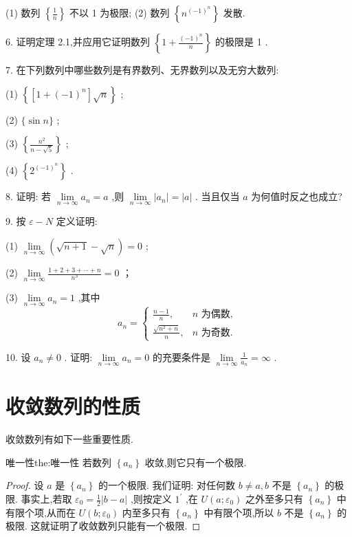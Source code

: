 (1) 数列 \(\left\{  \frac{1}{n}\right\}\) 不以 1 为极限; (2) 数列 \(\left\{  {n}^{{\left( -1\right) }^{n}}\right\}\) 发散.

6. 证明定理 2.1,并应用它证明数列 \(\left\{  {1 + \frac{{\left( -1\right) }^{n}}{n}}\right\}\) 的极限是 1 .

7. 在下列数列中哪些数列是有界数列、无界数列以及无穷大数列:

(1) \(\left\{  {\left\lbrack  {1 + {\left( -1\right) }^{n}}\right\rbrack  \sqrt{n}}\right\}\) ;

(2) \(\{ \sin n\}\) ;

(3) \(\left\{  \frac{{n}^{2}}{n - \sqrt{5}}\right\}\) ;

(4) \(\left\{  {2}^{{\left( -1\right) }^{n}}\right\}\) .

8. 证明: 若 \(\mathop{\lim }\limits_{{n \rightarrow  \infty }}{a}_{n} = a\) ,则 \(\mathop{\lim }\limits_{{n \rightarrow  \infty }}\left| {a}_{n}\right|  = \left| a\right|\) . 当且仅当 \(a\) 为何值时反之也成立?

9. 按 \(\varepsilon  - N\) 定义证明:

(1) \(\mathop{\lim }\limits_{{n \rightarrow  \infty }}\left( {\sqrt{n + 1} - \sqrt{n}}\right)  = 0\) ;

(2) \(\mathop{\lim }\limits_{{n \rightarrow  \infty }}\frac{1 + 2 + 3 + \cdots  + n}{{n}^{3}} = 0\) ；

(3) \(\mathop{\lim }\limits_{{n \rightarrow  \infty }}{a}_{n} = 1\) ,其中
\[
{a}_{n} = \left\{  \begin{array}{ll} \frac{n - 1}{n}, & n\text{ 为偶数, } \\  \frac{\sqrt{{n}^{2} + n}}{n}, & n\text{ 为奇数. } \end{array}\right.
\]

10. 设 \({a}_{n} \neq  0\) . 证明: \(\mathop{\lim }\limits_{{n \rightarrow  \infty }}{a}_{n} = 0\) 的充要条件是 \(\mathop{\lim }\limits_{{n \rightarrow  \infty }}\frac{1}{{a}_{n}} = \infty\) .

\section{收敛数列的性质}

收敛数列有如下一些重要性质.

\begin{theorem}{唯一性}{the:唯一性}
若数列 \(\left\{  {a}_{n}\right\}\) 收敛,则它只有一个极限.
\end{theorem}

\begin{proof}
设 \(a\) 是 \(\left\{  {a}_{n}\right\}\) 的一个极限. 我们证明: 对任何数 \(b \neq  a,b\) 不是 \(\left\{  {a}_{n}\right\}\) 的极限. 事实上,若取 \({\varepsilon }_{0} = \frac{1}{2}\left| {b - a}\right|\) ,则按定义 \({1}^{\prime }\) ,在 \(U\left( {a;{\varepsilon }_{0}}\right)\) 之外至多只有 \(\left\{  {a}_{n}\right\}\) 中有限个项,从而在 \(U\left( {b;{\varepsilon }_{0}}\right)\) 内至多只有 \(\left\{  {a}_{n}\right\}\) 中有限个项,所以 \(b\) 不是 \(\left\{  {a}_{n}\right\}\) 的极限. 这就证明了收敛数列只能有一个极限.
\end{proof}


